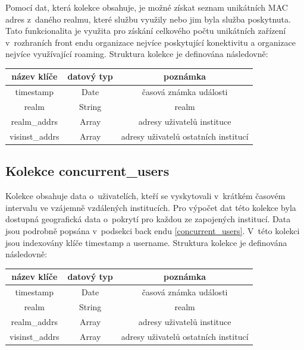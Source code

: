 \documentclass[thesis=M,czech]{FITthesis}[2012/06/26]
\begin{document}
      Pomocí dat, která kolekce obsahuje, je možné
      získat seznam unikátních MAC adres z~daného realmu,
      které službu využily nebo jim byla služba poskytnuta.
      Tato funkcionalita je využita pro získání celkového počtu unikátních
      zařízení v~rozhraních front endu 
      organizace nejvíce poskytující konektivitu a organizace nejvíce využívající roaming.
      Struktura kolekce je definována následovně:
      
      \begin{center}
        \begin{tabular}{ | c | c | c | }
          \hline
            název klíče     & datový typ & poznámka                              \\ \hline
            timestamp       & Date       & časová známka události                \\ \hline
            realm           & String     & realm                                 \\ \hline
            realm\_addrs    & Array      & adresy uživatelů instituce            \\ \hline
            visinst\_addrs  & Array      & adresy uživatelů ostatních institucí  \\
          \hline
        \end{tabular}
      \end{center}

    \subsection{Kolekce concurrent\_users}

      Kolekce obsahuje data o~uživatelích, kteří se vyskytovali v~krátkém
      časovém intervalu ve vzájemně vzdálených institucích.
      Pro výpočet dat této kolekce byla dostupná
      geografická data o~pokrytí pro každou ze zapojených institucí.
      Data jsou podrobně popsána v~podsekci back endu \ref{concurrent_users}.
      V~této kolekci jsou indexovány klíče timestamp a username.
      Struktura kolekce je definována následovně:
      
      \begin{center}
        \begin{tabular}{ | c | c | c | }
          \hline
            název klíče     & datový typ & poznámka                              \\ \hline
            timestamp       & Date       & časová známka události                \\ \hline
            realm           & String     & realm                                 \\ \hline
            realm\_addrs    & Array      & adresy uživatelů instituce            \\ \hline
            visinst\_addrs  & Array      & adresy uživatelů ostatních institucí  \\
          \hline
        \end{tabular}
      \end{center}
\end{document}

